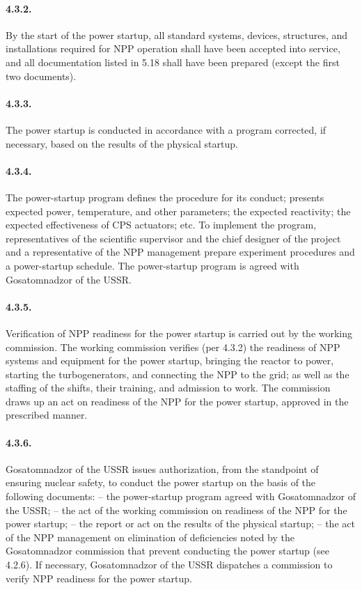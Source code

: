 \documentclass[openright]{bookest}
\begin{document}
\paragraph{4.3.2.} By the start of the power startup, all standard systems, devices, structures, and installations required for NPP operation shall have been accepted into service, and all documentation listed in 5.18 shall have been prepared (except the first two documents).

\paragraph{4.3.3.} The power startup is conducted in accordance with a program corrected, if necessary, based on the results of the physical startup.

\paragraph{4.3.4.} The power-startup program defines the procedure for its conduct; presents expected power, temperature, and other parameters; the expected reactivity; the expected effectiveness of CPS actuators; etc. To implement the program, representatives of the scientific supervisor and the chief designer of the project and a representative of the NPP management prepare experiment procedures and a power-startup schedule. The power-startup program is agreed with Gosatomnadzor of the USSR.

\paragraph{4.3.5.} Verification of NPP readiness for the power startup is carried out by the working commission. The working commission verifies (per 4.3.2) the readiness of NPP systems and equipment for the power startup, bringing the reactor to power, starting the turbogenerators, and connecting the NPP to the grid; as well as the staffing of the shifts, their training, and admission to work. The commission draws up an act on readiness of the NPP for the power startup, approved in the prescribed manner.

\paragraph{4.3.6.} Gosatomnadzor of the USSR issues authorization, from the standpoint of ensuring nuclear safety, to conduct the power startup on the basis of the following documents:
-- the power-startup program agreed with Gosatomnadzor of the USSR;
-- the act of the working commission on readiness of the NPP for the power startup;
-- the report or act on the results of the physical startup;
-- the act of the NPP management on elimination of deficiencies noted by the Gosatomnadzor commission that prevent conducting the power startup (see 4.2.6).
If necessary, Gosatomnadzor of the USSR dispatches a commission to verify NPP readiness for the power startup.
\end{document}
